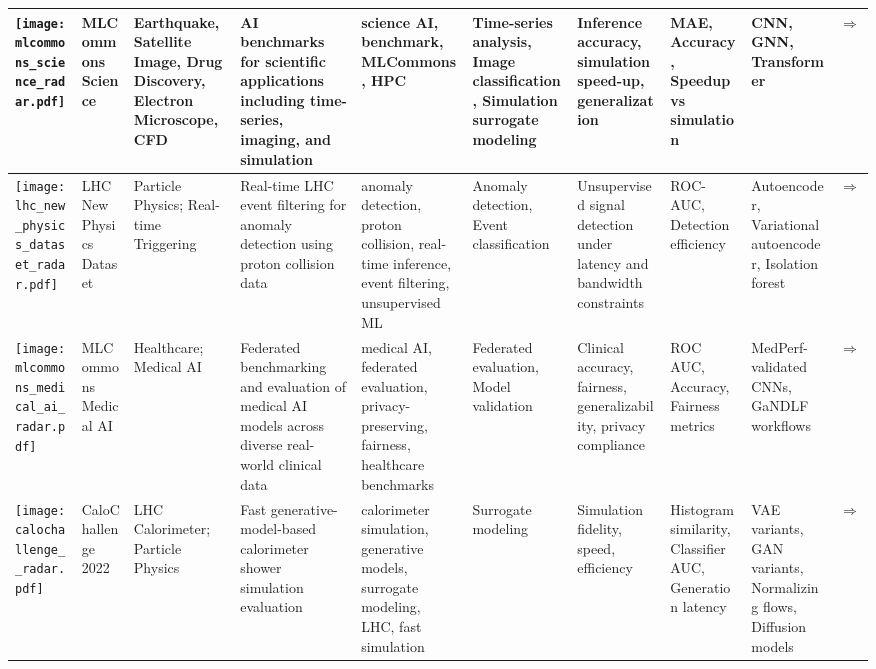 \begin{landscape}
{\begin{longtable}{|p{}|p{}|p{}|p{}|p{}|p{}|p{}|p{}|p{}|p{}|}
\texttt{[image: mlcommons\_science\_radar.pdf]} & MLCommons Science & Earthquake, Satellite Image, Drug Discovery, Electron Microscope, CFD & AI benchmarks for scientific applications including time-series, imaging, and simulation & science AI, benchmark, MLCommons, HPC & Time-series analysis, Image classification, Simulation surrogate modeling & Inference accuracy, simulation speed-up, generalization & MAE, Accuracy, Speedup vs simulation & CNN, GNN, Transformer & \cite{10.1007/978-3-031-23220-6_4}\href{https://github.com/mlcommons/science}{$\Rightarrow$} \\ \hline
\texttt{[image: lhc\_new\_physics\_dataset\_radar.pdf]} & LHC New Physics Dataset & Particle Physics; Real-time Triggering & Real-time LHC event filtering for anomaly detection using proton collision data & anomaly detection, proton collision, real-time inference, event filtering, unsupervised ML & Anomaly detection, Event classification & Unsupervised signal detection under latency and bandwidth constraints & ROC-AUC, Detection efficiency & Autoencoder, Variational autoencoder, Isolation forest & \cite{https://doi.org/10.5281/zenodo.5046389}\href{https://arxiv.org/pdf/2107.02157}{$\Rightarrow$} \\ \hline
\texttt{[image: mlcommons\_medical\_ai\_radar.pdf]} & MLCommons Medical AI & Healthcare; Medical AI & Federated benchmarking and evaluation of medical AI models across diverse real-world clinical data & medical AI, federated evaluation, privacy-preserving, fairness, healthcare benchmarks & Federated evaluation, Model validation & Clinical accuracy, fairness, generalizability, privacy compliance & ROC AUC, Accuracy, Fairness metrics & MedPerf-validated CNNs, GaNDLF workflows & \cite{karargyris2023federated}\href{https://github.com/mlcommons/medical}{$\Rightarrow$} \\ \hline
\texttt{[image: calochallenge\_\_radar.pdf]} & CaloChallenge 2022 & LHC Calorimeter; Particle Physics & Fast generative-model-based calorimeter shower simulation evaluation & calorimeter simulation, generative models, surrogate modeling, LHC, fast simulation & Surrogate modeling & Simulation fidelity, speed, efficiency & Histogram similarity, Classifier AUC, Generation latency & VAE variants, GAN variants, Normalizing flows, Diffusion models & \cite{krause2024calochallenge2022communitychallenge}\href{http://arxiv.org/abs/2410.21611}{$\Rightarrow$} \\ \hline

\end{longtable}}
\end{landscape}
